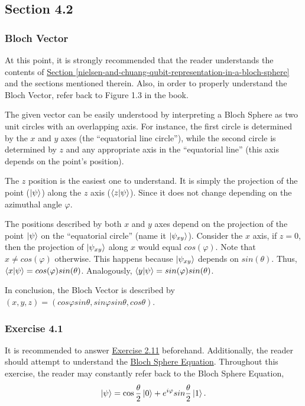 \subsection{Section 4.2}
\subsubsection{Bloch Vector}

At this point, it is strongly recommended that the reader understands the contents of
\hyperref[nielsen-and-chuang-qubit-representation-in-a-bloch-sphere]{
    Section \ref{nielsen-and-chuang-qubit-representation-in-a-bloch-sphere}
} and the sections mentioned therein.
Also, in order to properly understand the Bloch Vector,
refer back to Figure 1.3 in the book.

The given vector can be easily understood by interpreting a Bloch Sphere
as two unit circles with an overlapping axis.
For instance, the first circle is determined by the $x$ and $y$ axes
(the ``equatorial line circle''),
while the second circle is determined by $z$ and any
appropriate axis in the ``equatorial line''
(this axis depends on the point's position).

The $z$ position is the easiest one to understand.
It is simply the projection of the point ($\ket \psi$) along the $z$ axis ($\mathop{\mathinner{ \langle{z}|{\psi}\rangle}}$).
Since it does not change depending on the azimuthal angle $\varphi$.

The positions described by both $x$ and $y$ axes depend on the projection
of the point $\ket \psi$ on the ``equatorial circle'' (name it $\ket{\psi_{xy}}$).
Consider the $x$ axis, if $z = 0$, then the projection of $\ket{\psi_{xy}}$
along $x$ would equal $cos(\varphi)$.
Note that $x \neq cos(\varphi)$ otherwise.
This happens because $\ket{\psi_{xy}}$ depends on $sin(\theta)$.
Thus, $\mathop{\mathinner{ \langle{x}|{\psi}\rangle}} = cos(\varphi) sin(\theta)$.
Analogously, $\mathop{\mathinner{ \langle{y}|{\psi}\rangle}} = sin(\varphi) sin(\theta)$.

In conclusion, the Bloch Vector is described by
$(x, y, z) = (cos\varphi sin\theta, sin\varphi sin\theta, cos\theta)$.


\subsubsection{Exercise 4.1}
It is recommended to answer \hyperref[sec:nielsen-and-chuang-exercise-2-11]{Exercise 2.11} beforehand.
Additionally, the reader should attempt to understand the
\hyperref[nielsen-and-chuang-qubit-representation-in-a-bloch-sphere]{Bloch Sphere Equation}.
Throughout this exercise, the reader may constantly refer back to the Bloch Sphere Equation,
\begin{align}
    \ket \psi = \cos \frac \theta 2 \ket0 + e^{i \varphi} sin \frac \theta 2 \ket1 .
\end{align}


